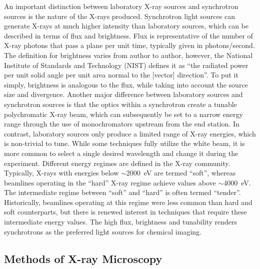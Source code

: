 \documentclass[journal=cmatex,manuscript=perspective]{achemso}
\begin{document}
An important distinction between laboratory X-ray sources and
synchrotron sources is the nature of the X-rays produced. Synchrotron
light sources can generate X-rays at much higher intensity than
laboratory sources, which can be described in terms of flux and
brightness. Flux is representative of the number of X-ray photons that
pass a plane per unit time, typically given in photons/second. The
definition for brightness varies from author to author, however, the
National Institute of Standards and Technology (NIST) defines it as
``the radiated power per unit solid angle per unit area normal to the
[vector] direction''\cite{sesame2004}. To put it simply, brightness is
analogous to the flux, while taking into account the source size and
divergence. Another major difference between laboratory sources and
synchrotron sources is that the optics within a synchrotron create a
tunable polychromatic X-ray beam, which can subsequently be set to a
narrow energy range through the use of monochromators upstream from
the end station. In contrast, laboratory sources only produce a
limited range of X-ray energies, which is non-trivial to tune. While
some techniques fully utilize the white beam\cite{ice2009}, it is more
common to select a single desired wavelength and change it during the
experiment. Different energy regimes are defined in the X-ray
community. Typically, X-rays with energies below $\sim$\SI{2000}{eV}
are termed ``soft'', whereas beamlines operating in the ``hard'' X-ray
regime achieve values above $\sim$\SI{4000}{eV}. The intermediate
regime between ``soft'' and ``hard'' is often termed
``tender''. Historically, beamlines operating at this regime were less
common than hard and soft counterparts, but there is renewed interest
in techniques that require these intermediate energy values. The high
flux, brightness and tunability renders synchrotrons as the preferred
light sources for chemical imaging.

\subsection{Methods of X-ray Microscopy}
\end{document}
